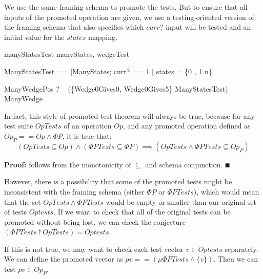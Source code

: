 \documentclass{llncs}
\begin{document}
We use the same framing schema to promote the tests.  But to ensure
that all inputs of the promoted operation are given, we use a
testing-oriented version of the framing schema that also specifies
which $curr?$ input will be tested and an initial value for the
$states$ mapping.

\begin{zsection}
  \SECTION manyStatesTest \parents manyStates, wedgeTest
\end{zsection}
\vspace{-5ex}
\begin{zed}
  \Phi ManyStatesTest ==
    [\Phi ManyStates; curr? == 1 | states = \{0 , 1 \mapsto n\}]
\end{zed}
\vspace{-5ex}
\begin{theorem}{ManyWedgePos}
  \vdash? ~ (\{Wedge0Gives0, Wedge0Gives5\} \land \Phi ManyStatesTest)
      \subseteq ManyWedge
\end{theorem}

In fact, this style of promoted test theorem will always be true,
because for any test suite $OpTests$ of an operation $Op$,
and any promoted operation defined as $Op_P == Op \land \Phi P$,
it is true that:
\[
   (OpTests \subseteq Op) \land (\Phi PTests \subseteq \Phi P)
   \implies (OpTests \land \Phi PTests \subseteq Op_P)
\]

\textbf{Proof:} follows from the monotonicity of $\subseteq$ and schema
conjunction. $\QED$

However, there is a possibility that some of the promoted tests
might be inconsistent with the framing schema (either $\Phi P$ or $\Phi
PTests$), which would mean that the set $OpTests \land \Phi PTests$
would be empty or smaller than our original set of tests $Optests$.
If we want to check that all of the original tests can be promoted without
being lost, we can check the conjecture
$(\Phi PTests \project OpTests) = Optests$.

If this is not true, we may want to check each test vector $v \in Optests$
separately.  We can define the promoted vector as 
$pv == (\mu \Phi PTests \land \{v\})$.
Then we can test $pv \in Op_P$. 
\end{document}
